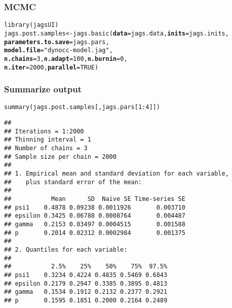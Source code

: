 \documentclass[color=usenames,dvipsnames]{beamer}\usepackage[]{graphicx}\usepackage[]{color}
\makeatletter
\newcommand{\hlnum}[1]{\textcolor[rgb]{0.69,0.494,0}{#1}}%
\newcommand{\hlstr}[1]{\textcolor[rgb]{0.749,0.012,0.012}{#1}}%
\newcommand{\hlopt}[1]{\textcolor[rgb]{0,0,0}{#1}}%
\newcommand{\hlstd}[1]{\textcolor[rgb]{0,0,0}{#1}}%
\newcommand{\hlkwb}[1]{\textcolor[rgb]{0,0.341,0.682}{#1}}%
\newcommand{\hlkwc}[1]{\textcolor[rgb]{0,0,0}{\textbf{#1}}}%
\newcommand{\hlkwd}[1]{\textcolor[rgb]{0.004,0.004,0.506}{#1}}%
\newenvironment{kframe}{%
 \def\at@end@of@kframe{}%
 \ifinner\ifhmode%
  \def\at@end@of@kframe{\end{minipage}}%
  \begin{minipage}{\columnwidth}%
 \fi\fi%
 \def\FrameCommand##1{\hskip\@totalleftmargin \hskip-\fboxsep
 \colorbox{shadecolor}{##1}\hskip-\fboxsep
     \hskip-\linewidth \hskip-\@totalleftmargin \hskip\columnwidth}%
 \MakeFramed {\advance\hsize-\width
   \@totalleftmargin\z@ \linewidth\hsize
   \@setminipage}}%
 {\par\unskip\endMakeFramed%
 \at@end@of@kframe}
\newenvironment{knitrout}{}{} %
\makeatother
\begin{document}
\begin{frame}[fragile]
  \frametitle{MCMC}
  \small
\begin{knitrout}\scriptsize
{}\color{fgcolor}\begin{kframe}
\begin{alltt}
\hlkwd{library}\hlstd{(jagsUI)}
\hlstd{jags.post.samples} \hlkwb{<-} \hlkwd{jags.basic}\hlstd{(}\hlkwc{data}\hlstd{=jags.data,} \hlkwc{inits}\hlstd{=jags.inits,}
                                \hlkwc{parameters.to.save}\hlstd{=jags.pars,}
                                \hlkwc{model.file}\hlstd{=}\hlstr{"dynocc-model.jag"}\hlstd{,}
                                \hlkwc{n.chains}\hlstd{=}\hlnum{3}\hlstd{,} \hlkwc{n.adapt}\hlstd{=}\hlnum{100}\hlstd{,} \hlkwc{n.burnin}\hlstd{=}\hlnum{0}\hlstd{,}
                                \hlkwc{n.iter}\hlstd{=}\hlnum{2000}\hlstd{,} \hlkwc{parallel}\hlstd{=}\hlnum{TRUE}\hlstd{)}
\end{alltt}
\end{kframe}
\end{knitrout}
\end{frame}



\begin{frame}[fragile]
  \frametitle{Summarize output}
\begin{knitrout}\tiny
{}\color{fgcolor}\begin{kframe}
\begin{alltt}
\hlkwd{summary}\hlstd{(jags.post.samples[,jags.pars[}\hlnum{1}\hlopt{:}\hlnum{4}\hlstd{]])}
\end{alltt}
\begin{verbatim}
## 
## Iterations = 1:2000
## Thinning interval = 1 
## Number of chains = 3 
## Sample size per chain = 2000 
## 
## 1. Empirical mean and standard deviation for each variable,
##    plus standard error of the mean:
## 
##           Mean      SD  Naive SE Time-series SE
## psi1    0.4878 0.09238 0.0011926       0.003710
## epsilon 0.3425 0.06788 0.0008764       0.004487
## gamma   0.2153 0.03497 0.0004515       0.001588
## p       0.2014 0.02312 0.0002984       0.001375
## 
## 2. Quantiles for each variable:
## 
##           2.5%    25%    50%    75%  97.5%
## psi1    0.3234 0.4224 0.4835 0.5469 0.6843
## epsilon 0.2179 0.2947 0.3385 0.3895 0.4813
## gamma   0.1534 0.1912 0.2132 0.2377 0.2921
## p       0.1595 0.1851 0.2000 0.2164 0.2489
\end{verbatim}
\end{kframe}
\end{knitrout}
\end{frame}
\end{document}
